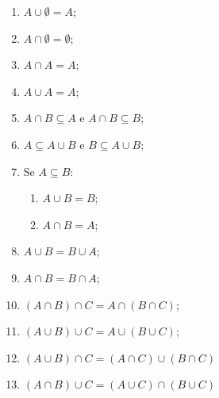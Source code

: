 \documentclass[12pt, letterpaper]{report}
\begin{document}
	\begin{enumerate}
		\item $A \cup \emptyset = A$;
		\item $A \cap \emptyset = \emptyset$;
		\item $A \cap A = A$;
		\item $A \cup A = A$;
		\item $A \cap B \subseteq  A$ e $A \cap B \subseteq B$;
		\item $A \subseteq A \cup  B$ e $B \subseteq A \cup B$;
		\item Se $A \subseteq B$:
			\begin{enumerate}
				\item $A \cup B = B$;
				\item $A \cap B = A$;
			\end{enumerate}
		\item $A \cup B = B \cup A$;
		\item $A \cap B = B \cap A$;
		\item $(A \cap B) \cap C = A \cap (B \cap C)$;
		\item $(A \cup B) \cup C = A \cup (B \cup C)$;
		\item $(A \cup B) \cap C = (A \cap C) \cup (B \cap C)$
		\item $(A \cap B) \cup C = (A \cup C) \cap (B \cup C)$
	\end{enumerate}
\end{document}
